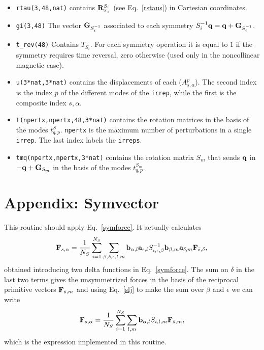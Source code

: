 \documentclass[12pt,a4paper,twoside]{report}
\begin{document}
\begin{itemize}
\item 
\texttt{rtau(3,48,nat)} contains ${\bf R}^{S_i}_{\boldsymbol{\tau}_s}$ (see Eq.~\ref{rstaus}) in Cartesian coordinates.

\item
\texttt{gi(3,48)} The vector ${\bf G}_{S_i^{-1}}$
associated to each symmetry $S_i^{-1}{\bf q}={\bf q}+{\bf G}_{S_i^{-1}}$.

\item 
\texttt{t\_rev(48)} Contains $T_{S_i}$.  For each symmetry operation it is equal to $1$ if the symmetry requires time reversal, zero otherwise (used only in the noncollinear magnetic case).

\item
\texttt{u(3*nat,3*nat)} contains the displacements 
of each ($A^p_{s,\alpha}$). The second index is the
index $p$ of the different modes of the \texttt{irrep}, while the first is the composite index ${s,\alpha}$.

\item 
\texttt{t(npertx,npertx,48,3*nat)} contains the rotation matrices in the basis of the modes $t^S_{q,p}$.
\texttt{npertx} is the maximum number of perturbations in a single \texttt{irrep}. The last index labels the \texttt{irreps}.

\item 
\texttt{tmq(npertx,npertx,3*nat)} contains the rotation matrix $S_m$ that sends $\bf {q}$ in
$-{\bf q}+{\bf G}_{S_m}$ in the basis of the modes $t^{S_m}_{q,p}$.



\end{itemize}

\section{Appendix: Symvector} 
This routine should apply Eq.~\ref{symforce}. It actually calculates 
\begin{equation}
{\bf F}_{s,\alpha} ={1 \over N_S} \sum_{i=1}^{N_S} \sum_{\beta, \delta, \epsilon, l, m} {\bf b}_{\alpha,l} {\bf a}_{\epsilon,l} S^{-1}_{i,\epsilon,\beta} {\bf b}_{\beta,m} {\bf a}_{\delta,m}
{\bf F}_{\bar s,\delta},
\label{symforceapp1}
\end{equation}
obtained introducing two delta functions in Eq.~\ref{symforce}. The sum on $\delta$ in the last two terms gives the unsymmetrized forces in the basis of the
reciprocal primitive vectors ${\bf F}_{{\bar s},m}$ and
using Eq.~\ref{slj} to make the sum over {$\beta$ and $\epsilon$} we can write 
\begin{equation}
{\bf F}_{s,\alpha} ={1 \over N_S} \sum_{i=1}^{N_S} \sum_{l, m} {\bf b}_{\alpha,l} S_{i,l,m}  {\bf F}_{\bar s,m},
\label{symforceapp2}
\end{equation}
which is the expression implemented in this routine.
\end{document}
